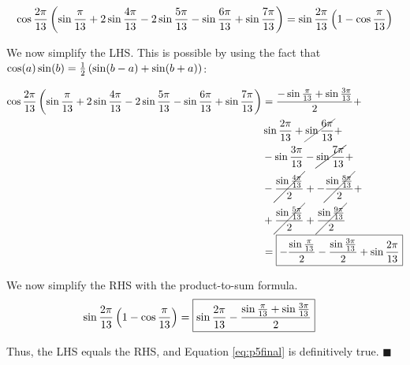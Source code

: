 \documentclass[10pt]{../usamts}
\begin{document}
\begin{solution}{5}
\begin{equation}
    \cos{{\frac{2\pi}{13}}}\left( \sin{{\frac{\pi}{13}}} + 2\sin{{\frac{4\pi}{13}}} - 2\sin{{\frac{5\pi}{13}}} - \sin{{\frac{6\pi}{13}}} + \sin{{\frac{7\pi}{13}}} \right)
    = \sin{{\frac{2\pi}{13}}}\left( 1 - \cos{{\frac{\pi}{13}}} \right)
    \label{eq:p5final}
\end{equation}

We now simplify the LHS. This is possible by using the fact that $\cos(a)\sin(b) = \frac{1}{2}\left( \sin(b-a) + \sin(b+a) \right)$:

\begin{align*}
    \cos{{\frac{2\pi}{13}}}\left( \sin{{\frac{\pi}{13}}} + 2\sin{{\frac{4\pi}{13}}} - 2\sin{{\frac{5\pi}{13}}} - \sin{{\frac{6\pi}{13}}} + \sin{{\frac{7\pi}{13}}} \right)
    &= \frac{-\sin{{\frac{\pi}{13}}} + \sin{{\frac{3\pi}{13}}}}{2} + \\
    &\sin{{\frac{2\pi}{13}}} + \cancel{\sin{{\frac{6\pi}{13}}}} + \\
    &- \sin{{\frac{3\pi}{13}}} -\cancel{\sin{{\frac{7\pi}{13}}}} + \\
    &-\cancel{\frac{\sin{{\frac{4\pi}{13}}}}{2}} + -\cancel{\frac{\sin{{\frac{8\pi}{13}}}}{2}} +\\
    &+ \cancel{\frac{\sin{{\frac{5\pi}{13}}}}{2}} + \cancel{\frac{\sin{{\frac{9\pi}{13}}}}{2}} \\
    &= \boxed{-\frac{\sin{{\frac{\pi}{13}}}}{2} - \frac{\sin{{\frac{3\pi}{13}}}}{2} + \sin{{\frac{2\pi}{13}}}}
\end{align*}

We now simplify the RHS with the product-to-sum formula.
\begin{align*}
    \sin{{\frac{2\pi}{13}}}\left( 1 - \cos{{\frac{\pi}{13}}} \right)
    &= \boxed{\sin{{\frac{2\pi}{13}}} - \frac{\sin{{\frac{\pi}{13}}} + \sin{{\frac{3\pi}{13}}}}{2}}
\end{align*}

Thus, the LHS equals the RHS, and Equation \ref{eq:p5final} is definitively true.
$\blacksquare$
\end{solution}
\end{document}
